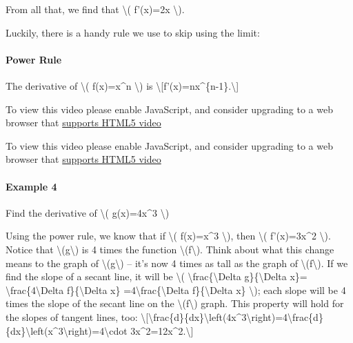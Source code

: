 From all that, we find that \textbackslash{}( f'(x)=2x
\textbackslash{}).

Luckily, there is a handy rule we use to skip using the limit:

\hypertarget{power-rule}{%
\paragraph{Power Rule}\label{power-rule}}

The derivative of \textbackslash{}( f(x)=x\^{}n \textbackslash{}) is
\textbackslash{}{[}f'(x)=nx\^{}\{n-1\}.\textbackslash{}{]}

To view this video please enable JavaScript, and consider upgrading to a
web browser that \href{http://videojs.com/html5-video-support/}{supports
HTML5 video}

To view this video please enable JavaScript, and consider upgrading to a
web browser that \href{http://videojs.com/html5-video-support/}{supports
HTML5 video}

\hypertarget{example-4}{%
\paragraph{Example 4}\label{example-4}}

Find the derivative of \textbackslash{}( g(x)=4x\^{}3 \textbackslash{})

Using the power rule, we know that if \textbackslash{}( f(x)=x\^{}3
\textbackslash{}), then \textbackslash{}( f'(x)=3x\^{}2
\textbackslash{}). Notice that \textbackslash{}(g\textbackslash{}) is 4
times the function \textbackslash{}(f\textbackslash{}). Think about what
this change means to the graph of \textbackslash{}(g\textbackslash{}) --
it's now 4 times as tall as the graph of
\textbackslash{}(f\textbackslash{}). If we find the slope of a secant
line, it will be \textbackslash{}(
\textbackslash{}frac\{\textbackslash{}Delta g\}\{\textbackslash{}Delta
x\}= \textbackslash{}frac\{4\textbackslash{}Delta
f\}\{\textbackslash{}Delta x\}
=4\textbackslash{}frac\{\textbackslash{}Delta f\}\{\textbackslash{}Delta
x\} \textbackslash{}); each slope will be 4 times the slope of the
secant line on the \textbackslash{}(f\textbackslash{}) graph. This
property will hold for the slopes of tangent lines, too:
\textbackslash{}{[}\textbackslash{}frac\{d\}\{dx\}\textbackslash{}left(4x\^{}3\textbackslash{}right)=4\textbackslash{}frac\{d\}\{dx\}\textbackslash{}left(x\^{}3\textbackslash{}right)=4\textbackslash{}cdot
3x\^{}2=12x\^{}2.\textbackslash{}{]}

